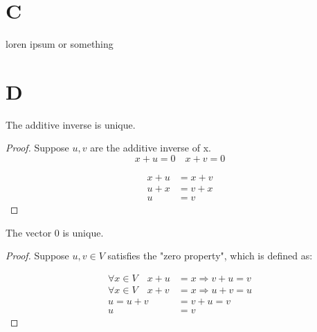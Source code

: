 \documentclass[11pt]{scrartcl}
\makeatletter
\newenvironment{Dequation}
  {%
  \def\tagform@##1{%
    \maketag@@@{\makebox[0pt][r]{(\ignorespaces##1\unskip\@@italiccorr)}}}%
  \ignorespaces
  }
  {%
  \def\tagform@##1{\maketag@@@{(\ignorespaces##1\unskip\@@italiccorr)}}%
  \ignorespacesafterend
  }
\makeatother
\begin{document}
\section{C}
loren ipsum or something 

\section{D}
\begin{corollary*}
	The additive inverse is unique.
\end{corollary*}

\begin{proof}
Suppose $u,v$ are the additive inverse of x.
\[x + u = 0 \quad x + v = 0\]
\begin{Dequation}
\begin{align*}
	x + u & = x + v \tag{Transitive property}\\ 
	u + x & = v + x \tag{Commutative property}\\
	u & = v \tag{Theorem 1.1}
\end{align*}
\end{Dequation}
\end{proof}

\begin{corollary*}
	The vector $0$ is unique.
\end{corollary*}

\begin{proof}
Suppose $u,v \in V$ satisfies the "zero property", which is defined as:

\begin{Dequation}
\begin{align*}
	\forall x \in V \quad x + u & = x \Rightarrow v + u = v \\
	\forall x \in V \quad x + v & = x \Rightarrow u + v = u \\
	u = u + v & = v + u = v \tag{Transitive property}\\
	u & = v \tag{Theorem 1.1}
\end{align*}
\end{Dequation}
\end{proof}
\end{document}
